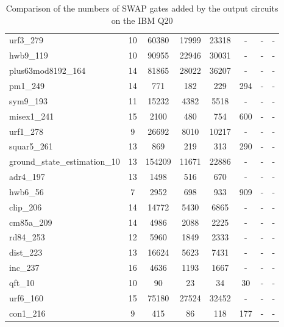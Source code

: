 \documentclass[runningheads]{llncs}
\begin{document}
\begin{table}[!ht]
\begin{center}
\begin{tabular}{|p{4.3cm}<{\centering}|c|c|c|c|c|c|c|}
urf3\_279 & 10 & 60380 & 17999 & 23318 & - & -& - \\
					hwb9\_119 & 10 & 90955 & 22946 & 30031 & - & -& - \\
plus63mod8192\_164 & 14 & 81865 & 28022 & 36207 & - & -& - \\
pm1\_249 & 14 & 771 & 182 & 229 & 294 & -& - \\
sym9\_193 & 11 & 15232 & 4382 & 5518 & - & -& - \\
misex1\_241 & 15 & 2100 & 480 & 754 & 600 & -& - \\
urf1\_278 & 9 & 26692 & 8010 & 10217 & - & -& - \\
squar5\_261 & 13 & 869 & 219 & 313 & 290 & -& - \\
ground\_state\_estimation\_10 & 13 & 154209 & 11671 & 22886 & - & -& - \\
adr4\_197 & 13 & 1498 & 516 & 670 & - & -& - \\
					hwb6\_56 & 7 & 2952 & 698 & 933 & 909 & -& - \\
clip\_206 & 14 & 14772 & 5430 & 6865 & - & -& - \\
cm85a\_209 & 14 & 4986 & 2088 & 2225 & - & -& - \\
rd84\_253 & 12 & 5960 & 1849 & 2333 & - & -& - \\
dist\_223 & 13 & 16624 & 5623 & 7431 & - & -& - \\
inc\_237 & 16 & 4636 & 1193 & 1667 & - & -& - \\
qft\_10 & 10 & 90 & 23 & 34 & 30 & -& - \\
urf6\_160 & 15 & 75180 & 27524 & 32452 & - & -& - \\
con1\_216 & 9 & 415 & 86 & 118 & 177 & -& - \\
					\hline
					\end{tabular} 
					\end{center}	
					\caption{Comparison of  the numbers of  SWAP gates added by the 
					output circuits on the IBM Q20 }  
					\label{tab6}
					\end{table}
				
\end{document}

